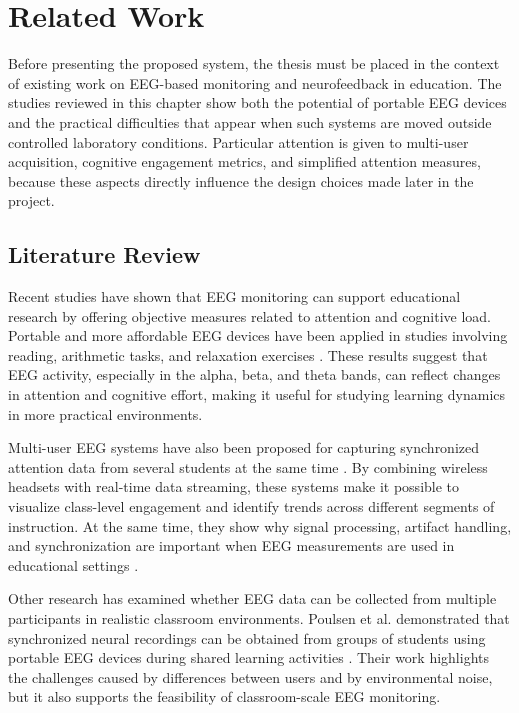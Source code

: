 \chapter{Related Work}\label{cap:relwork}
Before presenting the proposed system, the thesis must be placed in the context of existing work on EEG-based monitoring and neurofeedback in education. The studies reviewed in this chapter show both the potential of portable EEG devices and the practical difficulties that appear when such systems are moved outside controlled laboratory conditions. Particular attention is given to multi-user acquisition, cognitive engagement metrics, and simplified attention measures, because these aspects directly influence the design choices made later in the project.



\section{Literature Review}\label{sect:litrev}
Recent studies have shown that EEG monitoring can support educational research by offering objective measures related to attention and cognitive load. Portable and more affordable EEG devices have been applied in studies involving reading, arithmetic tasks, and relaxation exercises \cite{Emri2023}. These results suggest that EEG activity, especially in the alpha, beta, and theta bands, can reflect changes in attention and cognitive effort, making it useful for studying learning dynamics in more practical environments.


Multi-user EEG systems have also been proposed for capturing synchronized attention data from several students at the same time \cite{Apicella2022}. By combining wireless headsets with real-time data streaming, these systems make it possible to visualize class-level engagement and identify trends across different segments of instruction. At the same time, they show why signal processing, artifact handling, and synchronization are important when EEG measurements are used in educational settings \cite{Marzbani2016}.


Other research has examined whether EEG data can be collected from multiple participants in realistic classroom environments. Poulsen et al. demonstrated that synchronized neural recordings can be obtained from groups of students using portable EEG devices during shared learning activities \cite{Poulsen2017}. Their work highlights the challenges caused by differences between users and by environmental noise, but it also supports the feasibility of classroom-scale EEG monitoring.


